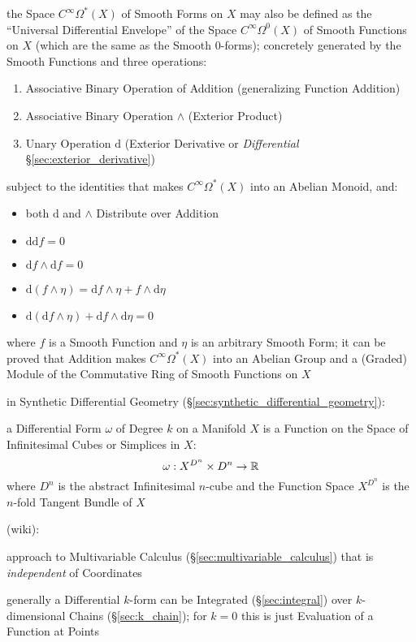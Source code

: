 the Space $C^\infty\Omega^*(X)$ of Smooth Forms on $X$ may also be defined as
the ``Universal Differential Envelope'' of the Space $C^\infty\Omega^0(X)$ of
Smooth Functions on $X$ (which are the same as the Smooth $0$-forms); concretely
generated by the Smooth Functions and three operations:
\begin{enumerate}
  \item Associative Binary Operation of Addition (generalizing Function
    Addition)
  \item Associative Binary Operation $\wedge$ (Exterior Product)
  \item Unary Operation $\mathrm{d}$ (Exterior Derivative or \emph{Differential}
    \S\ref{sec:exterior_derivative})
\end{enumerate}
subject to the identities that makes $C^\infty\Omega^*(X)$ into an Abelian
Monoid, and:
\begin{itemize}
  \item both $\mathrm{d}$ and $\wedge$ Distribute over Addition
  \item $\mathrm{dd} f = 0$
  \item $\mathrm{d}f \wedge \mathrm{d}f = 0$
  \item
    $\mathrm{d}(f\wedge\eta) = \mathrm{d}f\wedge\eta + f \wedge \mathrm{d}\eta$
  \item
    $\mathrm{d}(\mathrm{d}f\wedge\eta) + \mathrm{d}f\wedge\mathrm{d}\eta = 0$
\end{itemize}
where $f$ is a Smooth Function and $\eta$ is an arbitrary Smooth Form; it can be
proved that Addition makes $C^\infty\Omega^*(X)$ into an Abelian Group and a
(Graded) Module of the Commutative Ring of Smooth Functions on $X$

in Synthetic Differential Geometry
(\S\ref{sec:synthetic_differential_geometry}):

a Differential Form $\omega$ of Degree $k$ on a Manifold $X$ is a Function on
the Space of Infinitesimal Cubes or Simplices in $X$:
\[
  \omega : X^{D^n} \times D^n \rightarrow \mathbb{R}
\]
where $D^n$ is the abstract Infinitesimal $n$-cube and the Function Space
$X^{D^n}$ is the $n$-fold Tangent Bundle of $X$

(wiki):

approach to Multivariable Calculus (\S\ref{sec:multivariable_calculus})
that is \emph{independent} of Coordinates

generally a Differential $k$-form can be Integrated
(\S\ref{sec:integral}) over $k$-dimensional Chains (\S\ref{sec:k_chain}); for
$k=0$ this is just Evaluation of a Function at Points

